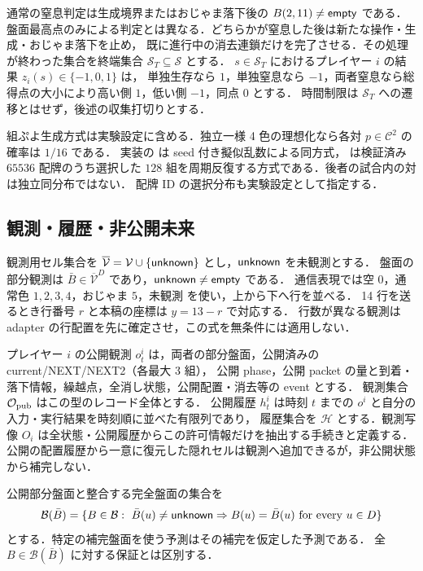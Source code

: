 通常の窒息判定は生成境界またはおじゃま落下後の $B(2,11)\ne\mathsf{empty}$ である．
盤面最高点のみによる判定とは異なる．どちらかが窒息した後は新たな操作・生成・おじゃま落下を止め，
既に進行中の消去連鎖だけを完了させる．その処理が終わった集合を終端集合 $\mathcal S_T\subseteq\mathcal S$ とする．
$s\in\mathcal S_T$ におけるプレイヤー $i$ の結果 $z_i(s)\in\{-1,0,1\}$ は，
単独生存なら $1$，単独窒息なら $-1$，両者窒息なら総得点の大小により高い側 $1$，低い側 $-1$，同点 $0$ とする．
時間制限は $\mathcal S_T$ への遷移とはせず，後述の収集打切りとする．

組ぷよ生成方式は実験設定に含める．独立一様 4 色の理想化なら各対 $p\in\mathcal C^2$ の確率は $1/16$ である．
実装の  は seed 付き擬似乱数による同方式， は検証済み
$65536$ 配牌のうち選択した $128$ 組を周期反復する方式である．後者の試合内の対は独立同分布ではない．
配牌 ID の選択分布も実験設定として指定する．

\subsection{観測・履歴・非公開未来}
観測用セル集合を $\overline{\mathcal V}=\mathcal V\cup\{\mathsf{unknown}\}$ とし，$\mathsf{unknown}$ を未観測とする．
盤面の部分観測は $\bar B\in\overline{\mathcal V}^{D}$ であり，$\mathsf{unknown}\ne\mathsf{empty}$ である．
通信表現では空 $0$，通常色 $1,2,3,4$，おじゃま $5$，未観測  を使い，上から下へ行を並べる．
14 行を送るとき行番号 $r$ と本稿の座標は $y=13-r$ で対応する．
行数が異なる観測は adapter の行配置を先に確定させ，この式を無条件には適用しない．

プレイヤー $i$ の公開観測 $o_t^i$ は，両者の部分盤面，公開済みの current/NEXT/NEXT2（各最大 $3$ 組），
公開 phase，公開 packet の量と到着・落下情報，繰越点，全消し状態，公開配置・消去等の event とする．
観測集合 $\mathcal O_{\rm pub}$ はこの型のレコード全体とする．
公開履歴 $h_t^i$ は時刻 $t$ までの $o^i$ と自分の入力・実行結果を時刻順に並べた有限列であり，
履歴集合を $\mathcal H$ とする．観測写像 $O_i$ は全状態・公開履歴からこの許可情報だけを抽出する手続きと定義する．
公開の配置履歴から一意に復元した隠れセルは観測へ追加できるが，非公開状態から補完しない．

公開部分盤面と整合する完全盤面の集合を
\begin{equation}\label{eq:completion}
 \mathcal B(\bar B)=\{B\in\mathcal B:\ \bar B(u)\ne\mathsf{unknown}\Rightarrow B(u)=\bar B(u)
 \text{ for every }u\in D\}
\end{equation}
とする．特定の補完盤面を使う予測はその補完を仮定した予測である．
全 $B\in\mathcal B(\bar B)$ に対する保証とは区別する．

